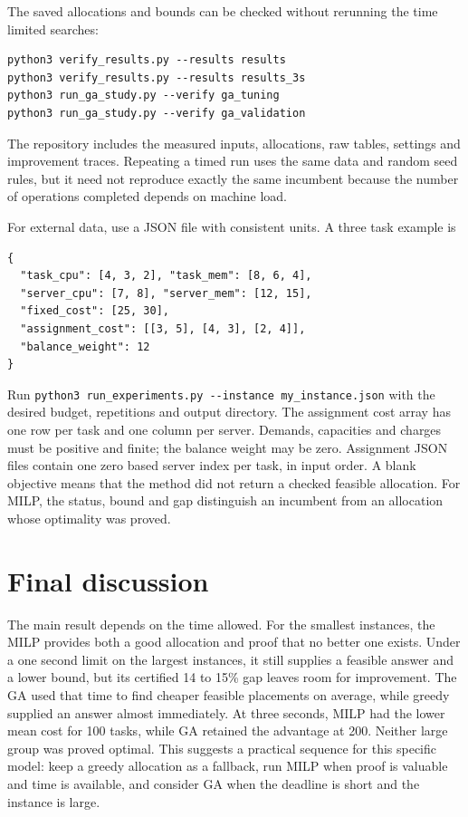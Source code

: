 \documentclass[10pt,a4paper]{article}
\begin{document}
The saved allocations and bounds can be checked without rerunning the time
limited searches:
\begin{verbatim}
python3 verify_results.py --results results
python3 verify_results.py --results results_3s
python3 run_ga_study.py --verify ga_tuning
python3 run_ga_study.py --verify ga_validation
\end{verbatim}
The repository includes the measured inputs, allocations, raw tables, settings
and improvement traces. Repeating a timed run uses the same data and random seed
rules, but it need not reproduce exactly the same incumbent because the number
of operations completed depends on machine load.

For external data, use a JSON file with consistent units. A three task example is
\begin{verbatim}
{
  "task_cpu": [4, 3, 2], "task_mem": [8, 6, 4],
  "server_cpu": [7, 8], "server_mem": [12, 15],
  "fixed_cost": [25, 30],
  "assignment_cost": [[3, 5], [4, 3], [2, 4]],
  "balance_weight": 12
}
\end{verbatim}
Run \texttt{python3 run\_experiments.py -{}-instance my\_instance.json} with
the desired budget, repetitions and output directory. The assignment cost
array has one row per task and one column per server. Demands, capacities and
charges must be positive and finite; the balance weight may be zero. Assignment
JSON files contain one zero based server index per task, in input order.
A blank objective means that the method did not return a checked feasible
allocation. For MILP, the status, bound and gap distinguish an incumbent from
an allocation whose optimality was proved.

\section{Final discussion}

The main result depends on the time allowed. For the smallest instances, the MILP
provides both a good allocation and proof that no better one exists. Under a
one second limit on the largest instances, it still supplies a feasible answer
and a lower bound, but its certified 14 to 15\% gap leaves room for improvement.
The GA used that time to find cheaper feasible placements on average, while
greedy supplied an answer almost immediately. At three seconds, MILP had the
lower mean cost for 100 tasks, while GA retained the advantage at 200. Neither
large group was proved optimal. This suggests a practical sequence for this
specific model: keep a greedy allocation as a fallback, run MILP when proof is
valuable and time is available, and consider GA when the deadline is short and
the instance is large.
\end{document}

